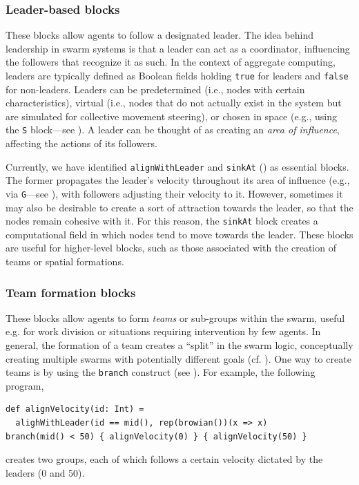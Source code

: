 \subsubsection{Leader-based blocks}\label{subsec:leader}
These blocks allow agents to follow a designated leader.
The idea behind leadership in swarm systems is that a leader 
 can act as a coordinator, influencing the followers that recognize it as such. 
% 
In the context of aggregate computing, 
 leaders are typically defined as Boolean fields holding \lstinline|true| for leaders 
 and \lstinline|false| for non-leaders. 
%
Leaders can be predetermined (i.e., nodes with certain characteristics), 
 virtual (i.e., nodes that do not actually exist in the system but are simulated for collective movement steering),
 or chosen in space (e.g., using the \lstinline|S| block---see ). %
% 
A leader can be thought of as creating an \emph{area of influence}, affecting the actions of its followers.


Currently, we have identified \lstinline|alignWithLeader| and \lstinline|sinkAt| () 
 as essential blocks. 
%
The former propagates the leader's velocity throughout 
 its area of influence (e.g., via \lstinline|G|---see ),
 with followers adjusting their velocity to it. 
%
However, sometimes it may also be desirable 
 to create a sort of attraction towards the leader, 
 so that the nodes remain cohesive with it. 
For this reason, the  \lstinline|sinkAt| block creates a computational field 
 in which nodes tend to move towards the leader. 
% 
These blocks are useful for higher-level blocks, 
 such as those associated with the creation of teams or spatial formations.
 
\subsubsection{Team formation blocks}\label{subsec:team}
These blocks allow agents to form \emph{teams} or sub-groups within the swarm,
 useful e.g. for work division
 or situations requiring intervention by few agents.
% 
% 
In general, the formation of a team creates a ``split'' in the swarm logic, 
 conceptually creating multiple swarms with potentially different goals (cf. ).
One way to create teams is by using the \lstinline|branch| construct (see ). 
For example, the following program,
\begin{lstlisting}
def alignVelocity(id: Int) = 
  alighWithLeader(id == mid(), rep(browian())(x => x)
branch(mid() < 50) { alignVelocity(0) } { alignVelocity(50) }
\end{lstlisting}
creates two groups, each of which follows a certain velocity dictated by the leaders (0 and 50).

